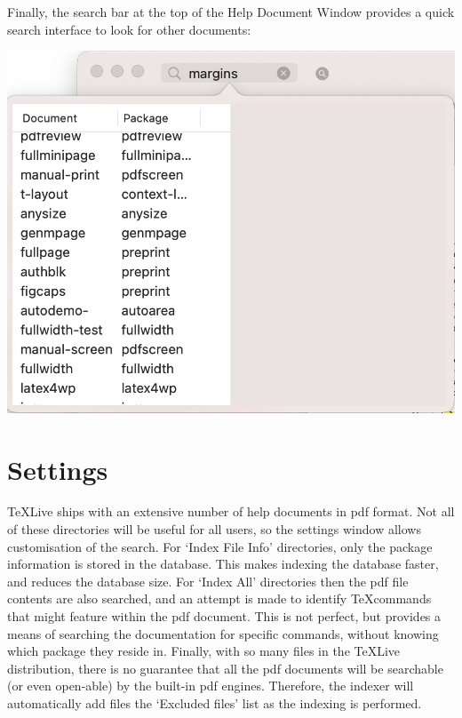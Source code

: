 \documentclass[11pt,a4paper]{article}
\begin{document}
Finally, the search bar at the top of the Help Document Window provides a quick search interface to look for other documents:

\includegraphics[scale=0.25]{QuickSearch.jpg}

\section{Settings}

\TeX Live ships with an extensive number of help documents in pdf format. Not all of these directories will be useful for all users, so the settings window allows customisation of the search. 
For `Index File Info' directories, only the package information is stored in the database. This makes indexing the database faster, and reduces the database size. 
For `Index All' directories then the pdf file contents are also searched, and an attempt is made to identify \TeX commands that might feature within the pdf document. This is not perfect, but provides a means of searching the documentation for specific commands, without knowing which package they reside in. 
Finally, with so many files in the \TeX Live distribution, there is no guarantee that all the pdf documents will be searchable (or even open-able) by the built-in pdf engines. Therefore, the indexer will automatically add files the `Excluded files' list as the indexing is performed. 
\end{document}
